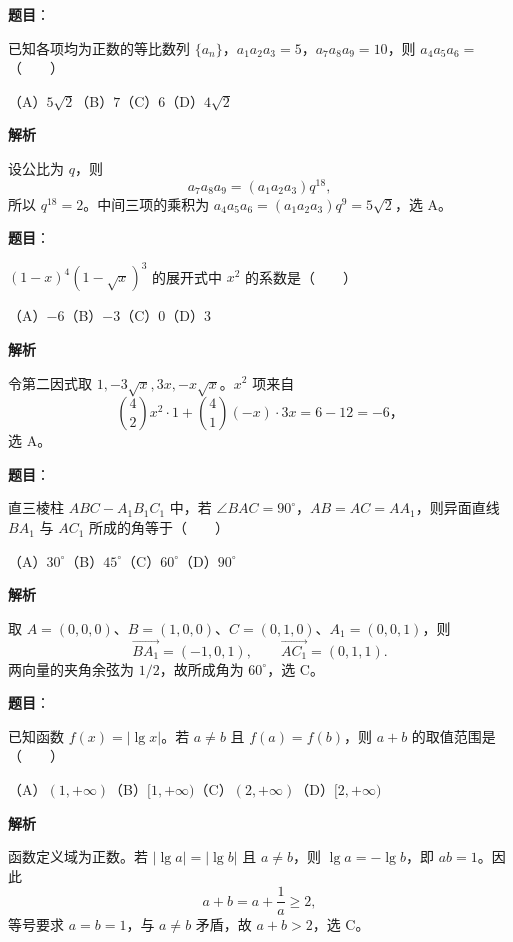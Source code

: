 \begin{answer}

\textbf{题目}：

已知各项均为正数的等比数列 $\{a_n\}$，$a_1a_2a_3=5$，$a_7a_8a_9=10$，则 $a_4a_5a_6=$\mbox{（　　）}

（A）$5\sqrt2$\quad（B）$7$\quad（C）$6$\quad（D）$4\sqrt2$

\textbf{解析}

设公比为 $q$，则
\nopagebreak[4]
\[
a_7a_8a_9=(a_1a_2a_3)q^{18},
\]
所以 $q^{18}=2$。中间三项的乘积为
$a_4a_5a_6=(a_1a_2a_3)q^9=5\sqrt2$，选 A。


\end{answer}
\begin{answer}

\textbf{题目}：

$(1-x)^4(1-\sqrt{x})^3$ 的展开式中 $x^2$ 的系数是\mbox{（　　）}

（A）$-6$\quad（B）$-3$\quad（C）$0$\quad（D）$3$

\textbf{解析}

令第二因式取 $1,-3\sqrt{x},3x,-x\sqrt{x}$。$x^2$ 项来自
\nopagebreak[4]
\[
\binom42x^2\cdot1+\binom41(-x)\cdot3x=6-12=-6\text{，}
\]
选 A。


\end{answer}
\begin{answer}

\textbf{题目}：

直三棱柱 $ABC-A_1B_1C_1$ 中，若 $\angle BAC=90^\circ$，$AB=AC=AA_1$，则异面直线 $BA_1$ 与 $AC_1$ 所成的角等于\mbox{（　　）}

（A）$30^\circ$\quad（B）$45^\circ$\quad（C）$60^\circ$\quad（D）$90^\circ$

\textbf{解析}

取 $A=(0,0,0)$、$B=(1,0,0)$、$C=(0,1,0)$、$A_1=(0,0,1)$，则
\nopagebreak[4]
\[
\overrightarrow{BA_1}=(-1,0,1),\qquad
\overrightarrow{AC_1}=(0,1,1).
\]
两向量的夹角余弦为 $1/2$，故所成角为 $60^\circ$，选 C。


\end{answer}
\begin{answer}

\textbf{题目}：

已知函数 $f(x)=|\lg x|$。若 $a\neq b$ 且 $f(a)=f(b)$，则 $a+b$ 的取值范围是\mbox{（　　）}

（A）$(1,+\infty)$\quad（B）$[1,+\infty)$\quad（C）$(2,+\infty)$\quad（D）$[2,+\infty)$

\textbf{解析}

函数定义域为正数。若 $|\lg a|=|\lg b|$ 且 $a\neq b$，则
$\lg a=-\lg b$，即 $ab=1$。因此
\nopagebreak[4]
\[
a+b=a+\frac1a\geq2,
\]
等号要求 $a=b=1$，与 $a\neq b$ 矛盾，故 $a+b>2$，选 C。


\end{answer}
